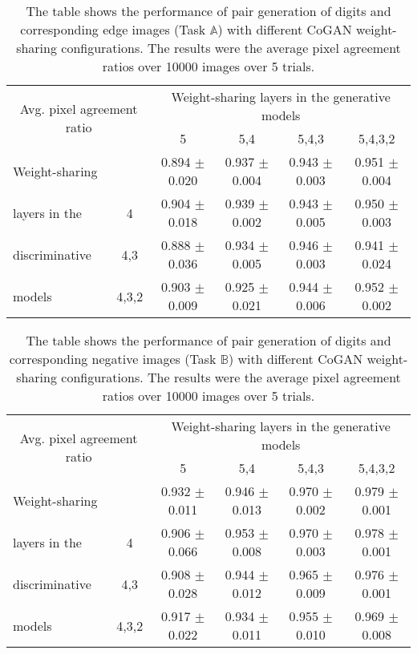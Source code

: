 \documentclass{article}
\begin{document}
\begin{table}[thb!]
\centering
{
\caption{The table shows the performance of pair generation of digits and corresponding edge images (Task $\mathbb{A}$) with different CoGAN weight-sharing configurations. The results were the average pixel agreement ratios over 10000 images over 5 trials.}
\label{tbl::weight_sharing_analysis_A} 
\begin{tabular}{lc|cccc}
\hline
\multicolumn{2}{c|}{\multirow{2}{*}{Avg. pixel agreement ratio}} & \multicolumn{4}{c}{Weight-sharing layers in the generative models}\\
\multicolumn{2}{c|}{}   & 5 & 5,4 & 5,4,3 & 5,4,3,2\\
\hline
Weight-sharing &       & 0.894 $\pm$ 0.020	& 0.937 $\pm$ 0.004 &	0.943 $\pm$ 0.003 &	0.951 $\pm$ 0.004 \\
layers in the  & 4     & 0.904 $\pm$	0.018 & 0.939 $\pm$ 0.002 &	0.943 $\pm$ 0.005 &	0.950 $\pm$ 0.003 \\
discriminative & 4,3   & 0.888 $\pm$	0.036 & 0.934 $\pm$ 0.005 &	0.946 $\pm$ 0.003 &	0.941 $\pm$ 0.024 \\
models         & 4,3,2 & 0.903 $\pm$ 0.009 &	0.925 $\pm$ 0.021 &	0.944 $\pm$ 0.006 &	0.952 $\pm$ 0.002 \\
\hline
\end{tabular}}
\end{table}

\begin{table}[thb!]
\centering
{
\caption{The table shows the performance of pair generation of digits and corresponding negative images (Task $\mathbb{B}$) with different CoGAN weight-sharing configurations. The results were the average pixel agreement ratios over 10000 images over 5 trials.}
\label{tbl::weight_sharing_analysis_B} 
\begin{tabular}{lc|cccc}
\hline
\multicolumn{2}{c|}{\multirow{2}{*}{Avg. pixel agreement ratio}} & \multicolumn{4}{c}{Weight-sharing layers in the generative models}\\
\multicolumn{2}{c|}{}   & 5 & 5,4 & 5,4,3 & 5,4,3,2\\
\hline
Weight-sharing &       & 0.932 $\pm$ 0.011 & 0.946 $\pm$ 0.013 &	0.970 $\pm$ 0.002 &	0.979 $\pm$ 0.001 \\
layers in the  & 4     & 0.906 $\pm$ 0.066 & 0.953 $\pm$ 0.008 &	0.970 $\pm$ 0.003 &	0.978 $\pm$ 0.001 \\
discriminative & 4,3   & 0.908 $\pm$ 0.028 & 0.944 $\pm$ 0.012 &	0.965 $\pm$ 0.009 &	0.976 $\pm$ 0.001 \\
models         & 4,3,2 & 0.917 $\pm$ 0.022 & 0.934 $\pm$ 0.011 &	0.955 $\pm$ 0.010 & 0.969 $\pm$ 0.008 \\
\hline
\end{tabular}}
\end{table}
\end{document}
